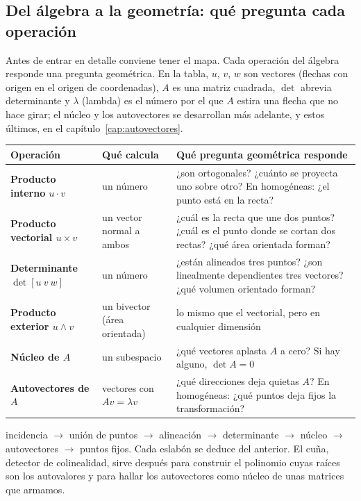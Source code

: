 \subsection{Del álgebra a la geometría: qué pregunta cada operación}\label{sec:algebra-geometria}

Antes de entrar en detalle conviene tener el mapa. Cada operación del álgebra responde una
pregunta geométrica. En la tabla, \(u\), \(v\), \(w\) son vectores (flechas con origen en el
origen de coordenadas), \(A\) es una matriz cuadrada, \(\det\) abrevia determinante y
\(\lambda\) (lambda) es el número por el que \(A\) estira una flecha que no hace girar; el
núcleo y los autovectores se desarrollan más adelante, y estos últimos, en el
capítulo~\ref{cap:autovectores}.

\begin{center}
\begin{tabularx}{\textwidth}{>{\bfseries}p{34mm} X X}
\toprule
Operación & Qué calcula & Qué pregunta geométrica responde\\
\midrule
Producto interno \(u\cdot v\) & un número & ¿son ortogonales? ¿cuánto se proyecta uno
sobre otro? En homogéneas: ¿el punto está en la recta?\\
Producto vectorial \(u\times v\) & un vector normal a ambos & ¿cuál es la recta que une dos
puntos? ¿cuál es el punto donde se cortan dos rectas? ¿qué área orientada forman?\\
Determinante \(\det[u\ v\ w]\) & un número & ¿están alineados tres puntos? ¿son
linealmente dependientes tres vectores? ¿qué volumen orientado forman?\\
Producto exterior \(u\wedge v\) & un bivector (área orientada) & lo mismo que el
vectorial, pero en cualquier dimensión\\
Núcleo de \(A\) & un subespacio & ¿qué vectores aplasta \(A\) a cero? Si hay alguno,
\(\det A=0\)\\
Autovectores de \(A\) & vectores con \(Av=\lambda v\) & ¿qué direcciones deja quietas
\(A\)? En homogéneas: ¿qué puntos deja fijos la transformación?\\
\bottomrule
\end{tabularx}
\end{center}

\begin{idea}[La cadena]
incidencia \(\to\) unión de puntos \(\to\) alineación \(\to\) determinante \(\to\)
núcleo \(\to\) autovectores \(\to\) puntos fijos. Cada eslabón se deduce del anterior. El
cuña, detector de colinealidad, sirve después para construir el polinomio cuyas raíces son los
autovalores y para hallar los autovectores como núcleo de unas matrices que armamos.
\end{idea}

